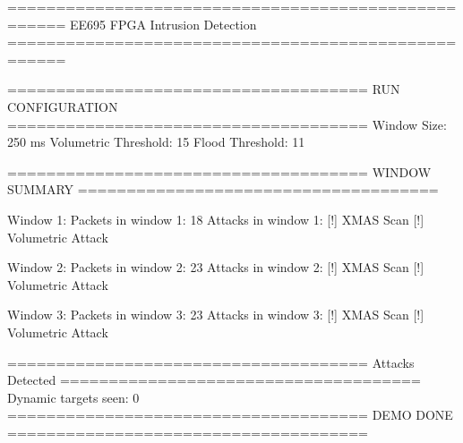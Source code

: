 ====================================================
        EE695 FPGA Intrusion Detection 
====================================================


=====================================
RUN CONFIGURATION
=====================================
Window Size: 250 ms
Volumetric Threshold: 15
Flood Threshold: 11


=====================================
WINDOW SUMMARY
=====================================

Window 1:
Packets in window 1: 18
Attacks in window 1:
  [!] XMAS Scan
  [!] Volumetric Attack

Window 2:
Packets in window 2: 23
Attacks in window 2:
  [!] XMAS Scan
  [!] Volumetric Attack

Window 3:
Packets in window 3: 23
Attacks in window 3:
  [!] XMAS Scan
  [!] Volumetric Attack


=====================================
Attacks Detected
=====================================
Dynamic targets seen: 0
=====================================
             DEMO DONE
=====================================
